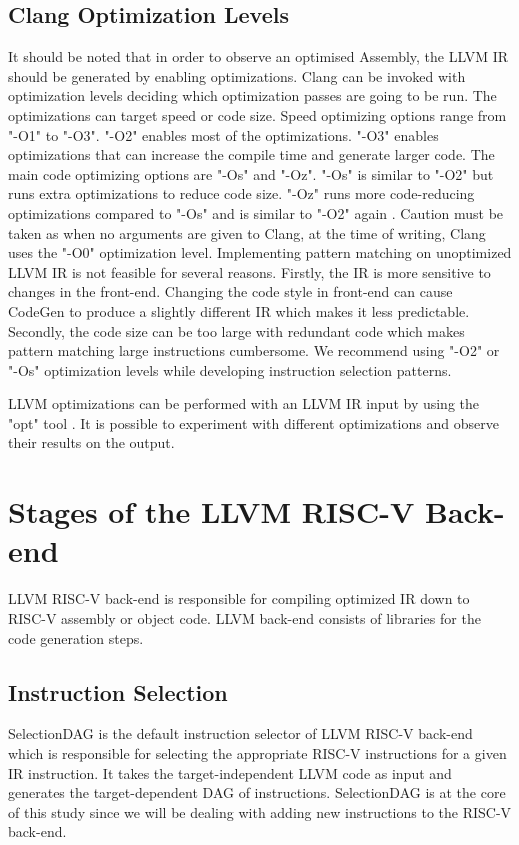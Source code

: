 \subsection{Clang Optimization Levels}
It should be noted that in order to observe an optimised Assembly, the LLVM IR should be generated by enabling optimizations.
Clang can be invoked with optimization levels deciding which optimization passes are going to be run. The optimizations can target speed or code size. Speed optimizing options range from "-O1" to "-O3". "-O2" enables most of the optimizations. "-O3" enables optimizations that can increase the compile time and generate larger code. The main code optimizing options are "-Os" and "-Oz". "-Os" is similar to "-O2" but runs extra optimizations to reduce code size. "-Oz" runs more code-reducing optimizations compared to "-Os" and is similar to "-O2" again \cite{clangCommands}.
Caution must be taken as when no arguments are given to Clang, at the time of writing, Clang uses the "-O0" optimization level. Implementing pattern matching on unoptimized LLVM IR is not feasible for several reasons. Firstly, the IR is more sensitive to changes in the front-end. Changing the code style in front-end can cause CodeGen to produce a slightly different IR which makes it less predictable. Secondly, the code size can be too large with redundant code which makes pattern matching large instructions cumbersome. We recommend using "-O2" or "-Os" optimization levels while developing instruction selection patterns. 

LLVM optimizations can be performed with an LLVM IR input by using the "opt" tool \cite{optimizer}. It is possible to experiment with different optimizations and observe their results on the output.

\section{Stages of the LLVM RISC-V Back-end}
LLVM RISC-V back-end is responsible for compiling optimized IR down to RISC-V assembly or object code. LLVM back-end consists of libraries for the code generation steps\cite{llvmbackend}.

\subsection{Instruction Selection}
SelectionDAG is the default instruction selector of LLVM RISC-V back-end which is responsible for selecting the appropriate RISC-V instructions for a given IR instruction. It takes the target-independent LLVM code as input and generates the target-dependent DAG of instructions. SelectionDAG is at the core of this study since we will be dealing with adding new instructions to the RISC-V back-end. 


